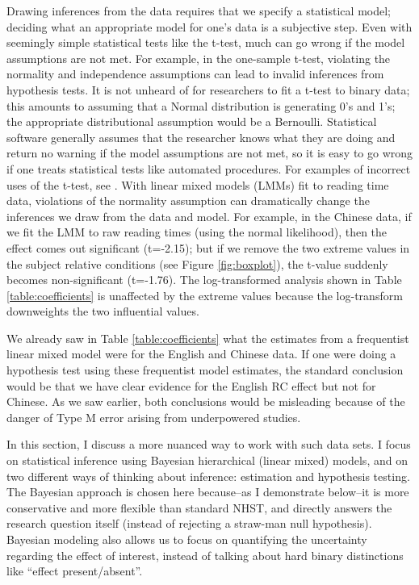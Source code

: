 \documentclass{ar-1col}\usepackage[]{graphicx}\usepackage[]{color}
\begin{document}
Drawing inferences from the data requires that we specify a statistical model; deciding what an appropriate model for one's data is a subjective step. Even with seemingly simple statistical tests like the t-test,  much can go wrong if the model assumptions are not met. For example, in the one-sample t-test, violating the normality and independence assumptions can lead to invalid inferences from hypothesis tests. It is not unheard of for researchers to fit a t-test to binary data; this amounts to assuming that a Normal distribution is generating 0's and 1's; the appropriate distributional assumption would be a Bernoulli. Statistical software generally assumes that the researcher knows what they are doing and return no warning if the model assumptions are not met, so it is easy to go wrong if one treats statistical tests like automated procedures. For examples of incorrect uses of the t-test, see \citet{NicenboimRoettgeretal,VasishthEtAlFreq2019}. With linear mixed models (LMMs) fit to reading time data, violations of the normality assumption  can dramatically change the inferences we draw from the data and model. For example, in the Chinese data, if we fit the LMM to raw reading times (using the normal likelihood), then the effect comes out significant (t=-2.15); but if we remove the two extreme values in the subject relative conditions (see Figure \ref{fig:boxplot}), the t-value suddenly becomes non-significant (t=-1.76). The log-transformed analysis shown in Table \ref{table:coefficients} is unaffected by the extreme values because the log-transform downweights the two influential values.

We already saw in Table \ref{table:coefficients} what the estimates from a frequentist linear mixed model were for the English and Chinese data. If one were doing a hypothesis test using these frequentist model estimates, the standard conclusion would be that we have clear evidence for the English RC effect but not for Chinese. As we saw earlier, both conclusions would be misleading because of the danger of Type M error arising from underpowered studies.

In this section, I discuss a more nuanced way to work with such data sets. I focus on statistical inference using Bayesian hierarchical (linear mixed) models, and on two different ways of thinking about inference: estimation and hypothesis testing. The Bayesian approach is chosen here because--as I demonstrate below--it is more conservative and more flexible than standard NHST, and directly answers the research question itself (instead of rejecting a straw-man null hypothesis). Bayesian modeling also allows us to focus on quantifying the uncertainty regarding the effect of interest, instead of talking about hard binary distinctions like ``effect present/absent''.
\end{document}
